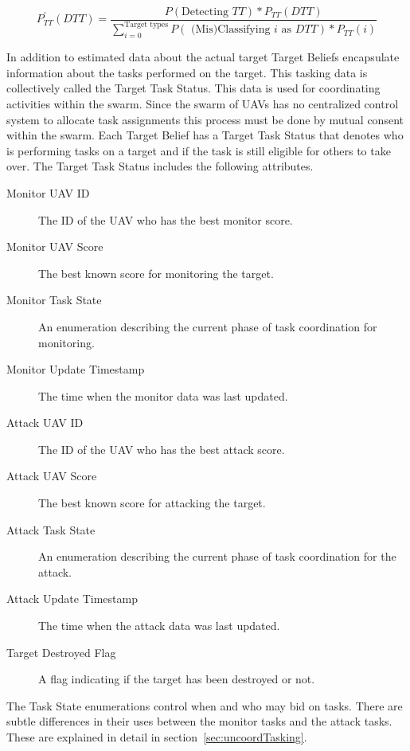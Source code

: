 \begin{equation}
\label{eq:bayesian}
P_{TT}^{'}(DTT) = \frac{ P(\text{Detecting }TT) * P_{TT}(DTT)} {\sum_{i=0}^{\text{Target types}}P(\text{ (Mis)Classifying } i \text{ as } DTT) * P_{TT}(i)}
\end{equation}


\begin{multicols}{2}
In addition to estimated data about the actual target Target Beliefs encapsulate information about the tasks performed on the target.  This tasking data is collectively called the Target Task Status.  This data is used for coordinating activities within the swarm.  Since the swarm of UAVs has no centralized control system to allocate task assignments this process must be done by mutual consent within the swarm.  Each Target Belief has a Target Task Status that denotes who is performing tasks on a target and if the task is still eligible for others to take over.  The Target Task Status includes the following attributes.

\begin{description}
	\item [Monitor UAV ID] The ID of the UAV who has the best monitor score.
	\item [Monitor UAV Score] The best known score for monitoring the target.
	\item [Monitor Task State] An enumeration describing the current phase of task coordination for monitoring.
	\item [Monitor Update Timestamp] The time when the monitor data was last updated.
	\item [Attack UAV ID] The ID of the UAV who has the best attack score.
	\item [Attack UAV Score] The best known score for attacking the target.
	\item [Attack Task State] An enumeration describing the current phase of task coordination for the attack.
	\item [Attack Update Timestamp] The time when the attack data was last updated.
	\item [Target Destroyed Flag] A flag indicating if the target has been destroyed or not.
\end{description}

The Task State enumerations control when and who may bid on tasks.  There are subtle differences in their uses between the monitor tasks and the attack tasks.  These are explained in detail in  section~\ref{sec:uncoordTasking}.



\end{multicols}
